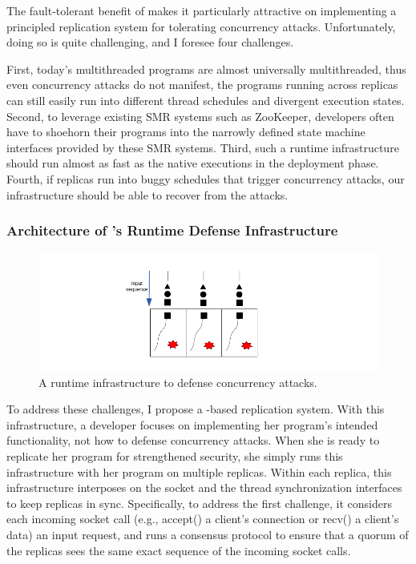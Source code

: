 The fault-tolerant benefit of \smr makes it particularly attractive
on implementing a principled replication system for tolerating concurrency 
attacks. Unfortunately, doing so is quite challenging, and I foresee four 
challenges.

First, today's multithreaded programs are almost universally
multithreaded, thus even concurrency attacks do not manifest, the programs 
running across replicas can still easily run into different thread schedules 
and divergent execution states. Second, to leverage existing SMR systems such 
as ZooKeeper, developers often have to shoehorn their programs into the 
narrowly defined state machine interfaces provided by these SMR systems. Third, 
such a runtime infrastructure should run almost as fast as the native 
executions in the deployment phase. Fourth, if replicas run into buggy 
schedules that trigger concurrency attacks, our infrastructure should be able 
to recover from the attacks.

\vspace{-.15in}\subsubsection{Architecture of \xxx's Runtime Defense 
Infrastructure} 
\label{sec:defense-arch}\vspace{-.075in}

\begin{figure}[ht]
\centering
\includegraphics[width=0.3\columnwidth]{figures/defense}
\vspace{-.05in}
\caption{{A runtime infrastructure to defense concurrency attacks.}} 
\label{fig:defense}
\vspace{-.05in}
\end{figure}

To address these challenges, I propose a \smr-based replication 
system. With this infrastructure, a developer focuses on implementing her 
program's intended functionality, not how to defense concurrency attacks. When 
she is ready to replicate her program for strengthened security, she simply
runs this infrastructure with her program on multiple replicas. Within
each replica, this infrastructure interposes on the socket and the thread
synchronization interfaces to keep replicas in sync. Specifically, to address 
the first challenge, it considers each incoming socket call (e.g., accept() a 
client's connection or recv() a client's data) an input request, and runs a 
\paxos consensus protocol to ensure that a quorum of the replicas sees the same 
exact sequence of the incoming socket calls.


